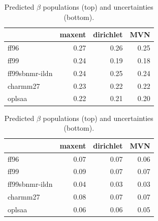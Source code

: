 \documentclass[12pt]{article}
\begin{document}
\clearpage

\begin{table}

\begin{tabular}{lrrr}
\toprule
{} &  maxent &  dirichlet &  MVN \\
\midrule
ff96           &    0.27 &       0.26 & 0.25 \\
ff99           &    0.24 &       0.19 & 0.18 \\
ff99sbnmr-ildn &    0.24 &       0.25 & 0.24 \\
charmm27          &    0.23 &       0.22 & 0.22 \\
oplsaa            &    0.22 &       0.21 & 0.20 \\
\bottomrule
\end{tabular}


\begin{tabular}{lrrr}
\toprule
{} &  maxent &  dirichlet &  MVN \\
\midrule
ff96           &    0.07 &       0.07 & 0.06 \\
ff99           &    0.09 &       0.07 & 0.07 \\
ff99sbnmr-ildn &    0.04 &       0.03 & 0.03 \\
charmm27          &    0.08 &       0.07 & 0.07 \\
oplsaa            &    0.06 &       0.06 & 0.05 \\
\bottomrule
\end{tabular}

\caption{
Predicted $\beta$ populations (top) and uncertainties (bottom).  
}
\end{table}

\clearpage
\end{document}

